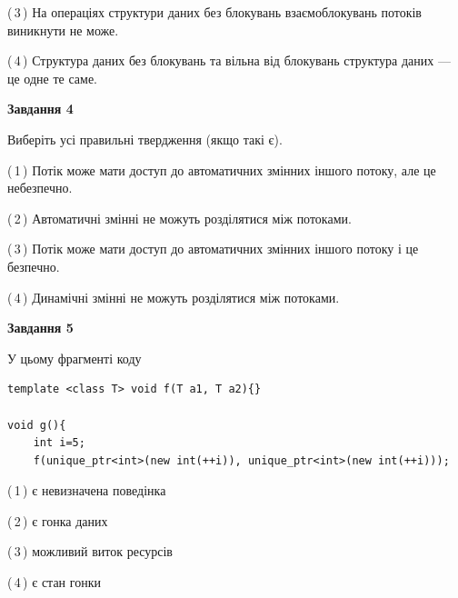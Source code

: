 \documentclass[12pt, ukrainian]{article}
\begin{document}
\begin {large}
{(\,3\,) На операціях структури даних без блокувань взаємоблокувань потоків виникнути не може.%

(\,4\,) Структура даних без блокувань та вільна від блокувань структура даних --- це одне те саме.%



\begin{center}
\textbf{Завдання 4}
\end{center}
Виберіть усі правильні твердження (якщо такі є).\par
\vspace{2mm}

(\,1\,) Потік може мати доступ до автоматичних змінних іншого потоку, але це небезпечно.%

(\,2\,) Автоматичні змінні не можуть розділятися між потоками.%

(\,3\,) Потік може мати доступ до автоматичних змінних іншого потоку і це безпечно.%

(\,4\,) Динамічні змінні не можуть розділятися між потоками.%



\begin{center}
\textbf{Завдання 5}
\end{center}
У цьому фрагменті коду
\begin{verbatim}
template <class T> void f(T a1, T a2){}

void g(){
    int i=5;
    f(unique_ptr<int>(new int(++i)), unique_ptr<int>(new int(++i)));
\end{verbatim}

(\,1\,) є невизначена поведінка%

(\,2\,) є гонка даних%

(\,3\,) можливий виток ресурсів%

(\,4\,) є стан гонки%


}
\end {large}
\end{document}
